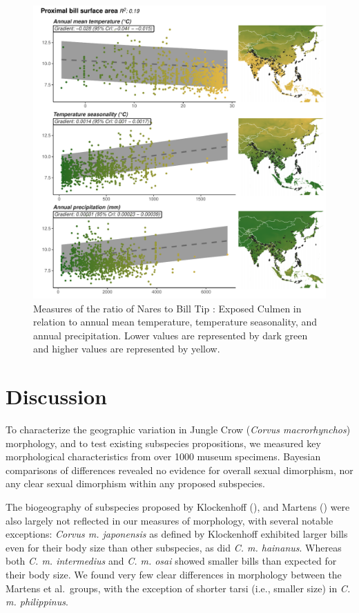 \documentclass[10pt,a4paper]{article}
\begin{document}
\begin{figure}
\includegraphics[width=0.9\linewidth]{../Figures/climMap_ExCuNtBTxHaNaTaLe} \caption{Measures of the ratio of Nares to Bill Tip : Exposed Culmen in relation to annual mean temperature, temperature seasonality, and annual precipitation. Lower values are represented by dark green and higher values are represented by yellow.}\label{fig:climateComparisonMapPBSA}
\end{figure}

\section{Discussion}\label{discussion}

To characterize the geographic variation in Jungle Crow (\emph{Corvus macrorhynchos}) morphology, and to test existing subspecies propositions, we measured key morphological characteristics from over 1000 museum specimens.
Bayesian comparisons of differences revealed no evidence for overall sexual dimorphism, nor any clear sexual dimorphism within any proposed subspecies.

The biogeography of subspecies proposed by Klockenhoff (), and Martens () were also largely not reflected in our measures of morphology, with several notable exceptions: \emph{Corvus m. japonensis} as defined by Klockenhoff exhibited larger bills even for their body size than other subspecies, as did \emph{C. m. hainanus}.
Whereas both \emph{C. m. intermedius} and \emph{C. m. osai} showed smaller bills than expected for their body size.
We found very few clear differences in morphology between the Martens et al.~groups, with the exception of shorter tarsi (i.e., smaller size) in \emph{C. m. philippinus}.
\end{document}

